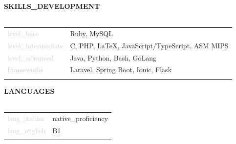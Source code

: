 \documentclass{article}
\begin{document}
\textbf{\textcolor{deepblue}{\uppercase{{{skills_development}}}}} \\\\ \hfill
\begin{tabular}{ R{4cm} L{11cm} }
	\textcolor{lightgray}{{{level_base}}} & Ruby, MySQL \\ \hfill
	\textcolor{lightgray}{{{level_intermediate}}} & C, PHP, LaTeX, JavaScript/TypeScript, ASM MIPS \\ \hfill
	\textcolor{lightgray}{{{level_advanced}}} & Java, Python, Bash, GoLang \\[.5cm] \hfill
	\textcolor{lightgray}{Frameworks} & Laravel, Spring Boot, Ionic, Flask\\ \hfill
\end{tabular}

\textbf{\textcolor{deepblue}{\uppercase{{{languages}}}}} \\\\ \hfill
\begin{tabular}{ R{4cm} L{11cm} }
	\textcolor{lightgray}{{{lang_italian}}} & {{native_proficiency}} \\ \hfill
	\textcolor{lightgray}{{{lang_english}}} & B1 \\ \hfill
\end{tabular}
\end{document}
